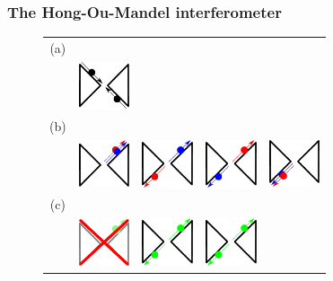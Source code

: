 \subsubsection*{The Hong-Ou-Mandel interferometer}

\begin{figure}[hptb]
	\begin{center}
		\begin{tabular}{c c c c c}
			(a) & & & & \\
			& \includegraphics[width = 1.5cm]{./chap1/dessin_HOM_a_1}
			&  & &  \\
			(b) & & & & \\
			& \includegraphics[width = 1.5cm]{./chap1/dessin_HOM_b_1}
			& \includegraphics[width = 1.5cm]{./chap1/dessin_HOM_b_2} 
			& \includegraphics[width = 1.5cm]{./chap1/dessin_HOM_b_3}
			& \includegraphics[width = 1.5cm]{./chap1/dessin_HOM_b_4} \\
			(c) & & & & \\
			& \includegraphics[width = 1.5cm]{./chap1/dessin_HOM_c_1}
			& \includegraphics[width = 1.5cm]{./chap1/dessin_HOM_c_2} 
			& \includegraphics[width = 1.5cm]{./chap1/dessin_HOM_c_2} 

\end{tabular}
\end{center}
\end{figure}
